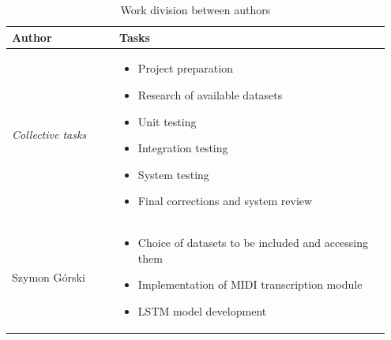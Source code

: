 \documentclass[a4paper, 11pt, twoside]{report}
\theoremstyle{definition}
\begin{document}
\begin{table}[H]
    \centering
    \caption{Work division between authors} \vskip16pt
    \label{tab:work-division}
    \begin{tabular}{ |P{0.27\linewidth}|R{0.68\linewidth}| }
        \hline
        \small \setlength{\baselineskip}{5pt}Author             & \small Tasks                                                    \\
        \hline

        \setlength{\baselineskip}{5pt}\textit{Collective tasks} &
        \setlength{\baselineskip}{5pt}\begin{itemize}
                                          \setlength{\baselineskip}{5pt}    \item Project preparation
                                                \setlength{\baselineskip}{5pt}    \item Research of available datasets
                                                \setlength{\baselineskip}{5pt}    \item Unit testing
                                                \setlength{\baselineskip}{5pt}    \item Integration testing
                                                \setlength{\baselineskip}{5pt}    \item System testing
                                                \setlength{\baselineskip}{5pt}    \item Final corrections and system review
                                                \setlength{\baselineskip}{5pt}\end{itemize}                  \\
        \hline

        \setlength{\baselineskip}{5pt}Szymon Górski             &
        \setlength{\baselineskip}{5pt}\begin{itemize}
                                          \setlength{\baselineskip}{5pt}    \item Choice of datasets to be included and accessing them
                                                \setlength{\baselineskip}{5pt}    \item Implementation of MIDI transcription module
                                                \setlength{\baselineskip}{5pt}    \item LSTM model development
                                                \setlength{\baselineskip}{5pt}\end{itemize} \\
        \hline


\end{tabular}
\end{table}
\end{document}
